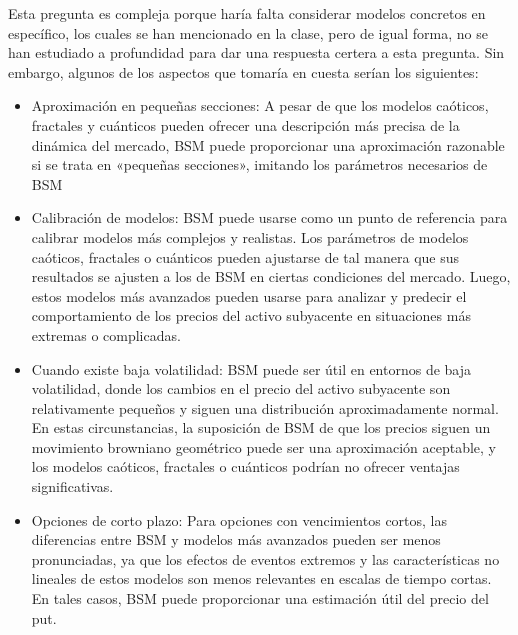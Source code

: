 \begin{problema}[Problema D]
\begin{itemize}
\begin{sol}
            Esta pregunta es compleja porque haría falta considerar modelos concretos en específico, los cuales se han mencionado en la clase, pero de igual forma, no se han estudiado a profundidad para dar una respuesta certera a esta pregunta. Sin embargo, algunos de los aspectos que tomaría en cuesta serían los siguientes: 
            \begin{itemize}
                \item  Aproximación en pequeñas secciones: A pesar de que los modelos caóticos, fractales y cuánticos pueden ofrecer una descripción más precisa de la dinámica del mercado, BSM puede proporcionar una aproximación razonable si se trata en «pequeñas secciones», imitando los parámetros necesarios de BSM 
                \item Calibración de modelos: BSM puede usarse como un punto de referencia para calibrar modelos más complejos y realistas. Los parámetros de modelos caóticos, fractales o cuánticos pueden ajustarse de tal manera que sus resultados se ajusten a los de BSM en ciertas condiciones del mercado. Luego, estos modelos más avanzados pueden usarse para analizar y predecir el comportamiento de los precios del activo subyacente en situaciones más extremas o complicadas.
                \item Cuando existe baja volatilidad: BSM puede ser útil en entornos de baja volatilidad, donde los cambios en el precio del activo subyacente son relativamente pequeños y siguen una distribución aproximadamente normal. En estas circunstancias, la suposición de BSM de que los precios siguen un movimiento browniano geométrico puede ser una aproximación aceptable, y los modelos caóticos, fractales o cuánticos podrían no ofrecer ventajas significativas.
                \item Opciones de corto plazo: Para opciones con vencimientos cortos, las diferencias entre BSM y modelos más avanzados pueden ser menos pronunciadas, ya que los efectos de eventos extremos y las características no lineales de estos modelos son menos relevantes en escalas de tiempo cortas. En tales casos, BSM puede proporcionar una estimación útil del precio del put.
            \end{itemize}



        \end{sol}
    \end{itemize}
   


\end{problema}



